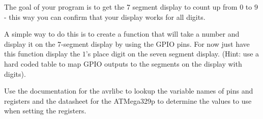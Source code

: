 \documentclass[main.tex]{subfile}
\begin{document}
The goal of your program is to get the 7 segment display to count up from $0$ to
$9$ - this way you can confirm that your display works for all digits.

A simple way to do this is to create a function that will take a number and
display it on the 7-segment display by using the GPIO pins. For now just have
this function display the $1$'s place digit on the seven segment display. (Hint: use a
hard coded table to map GPIO outputs to the segments on the display with digits).

Use the documentation for the avrlibc to lookup the variable names of pins and
registers and the datasheet for the ATMega329p to determine the values to use
when setting the registers.

\end{document}
